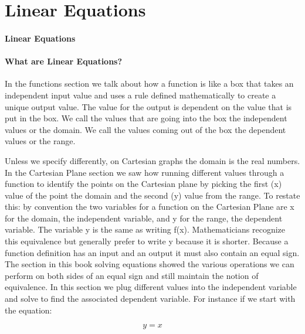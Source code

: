 \section{Linear Equations}
\label{sec:linear-equations}

\paragraph{Linear Equations}



\paragraph{What are Linear Equations?}



In the functions section we talk about how a function is like a box that takes an independent input value and uses a rule defined mathematically to create a unique output value. The value for the output is dependent on the value that is put in the box. We call the values that are going into the box the independent values or the domain. We call the values coming out of the box the dependent values or the range.



Unless we specify differently, on Cartesian graphs the domain is the real numbers. In the Cartesian Plane section we saw how running different values through a function to identify the points on the Cartesian plane by picking the first (x) value of the point the domain and the second (y) value from the range. To restate this: by convention the two variables for a function on the Cartesian Plane are x for the domain, the independent variable, and y for the range, the dependent variable. The variable y is the same as writing f(x). Mathematicians recognize this equivalence but generally prefer to write y because it is shorter. Because a function definition has an input and an output it must also contain an equal sign. The section in this book solving equations showed the various operations we can perform on both sides of an equal sign and still maintain the notion of equivalence. In this section we plug different values into the independent variable and solve to find the associated dependent variable. For instance if we start with the equation:



$$y = x$$



